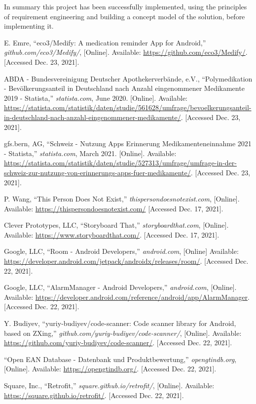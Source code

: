 \documentclass[conference]{IEEEtran}
\begin{document}
In summary this project has been successfully implemented, using the principles of requirement engineering and 
building a concept model of the solution, before implementing it.

\begin{thebibliography}{00}	
	 E. Emre, ``eco3/Medify: A medication reminder App for Android,'' \textit{github.com/eco3/Medify/}, [Online]. Available: \url{https://github.com/eco3/Medify/}. [Accessed Dec. 23, 2021].
	
	 ABDA - Bundesvereinigung Deutscher Apothekerverbände, e.V., ``Polymedikation - Bevölkerungsanteil in Deutschland nach Anzahl eingenommener Medikamente 2019 - Statista,'' \textit{statista.com}, June 2020. [Online]. Available: \url{https://statista.com/statistik/daten/studie/561628/umfrage/bevoelkerungsanteil-in-deutschland-nach-anzahl-eingenommener-medikamente/}. [Accessed Dec. 23, 2021]. 
	
	 gfs.bern, AG, ``Schweiz - Nutzung Apps Erinnerung Medikamenteneinnahme 2021 - Statista,'' \textit{statista.com}, March 2021. [Online]. Available: \url{https://statista.com/statistik/daten/studie/527313/umfrage/umfrage-in-der-schweiz-zur-nutzung-von-erinnerungs-apps-fuer-medikamente/}. [Accessed Dec. 23, 2021]. 
	
	 P. Wang, ``This Person Does Not Exist,'' \textit{thispersondoesnotexist.com}, [Online]. Available: \url{https://thispersondoesnotexist.com/} [Accessed Dec. 17, 2021].

	 Clever Prototypes, LLC, ``Storyboard That,'' \textit{storyboardthat.com}, [Online]. Available: \url{https://www.storyboardthat.com/}. [Accessed Dec. 17, 2021].
	
	 Google, LLC, ``Room - Android Developers,'' \textit{android.com}, [Online] Available: \url{https://developer.android.com/jetpack/androidx/releases/room/}. [Accessed Dec. 22, 2021].
		
	 Google, LLC, ``AlarmManager - Android Developers,'' \textit{android.com}, [Online]. Available: \url{https://developer.android.com/reference/android/app/AlarmManager}. [Accessed Dec. 22, 2021].

	 Y. Budiyev, ``yuriy-budiyev/code-scanner: Code scanner library for Android, based on ZXing,'' \textit{github.com/yuriy-budiyev/code-scanner/}, [Online]. Available: \url{https://github.com/yuriy-budiyev/code-scanner/}. [Accessed Dec. 22, 2021].

	 ``Open EAN Database - Datenbank und Produktbewertung,'' \textit{opengtindb.org}, [Online]. Available: \url{https://opengtindb.org/}. [Accessed Dec. 22, 2021].
	
	 Square, Inc., ``Retrofit,'' \textit{square.github.io/retrofit/}, [Online]. Available: \url{https://square.github.io/retrofit/}. [Accessed Dec. 22, 2021].
\end{thebibliography}
\end{document}
